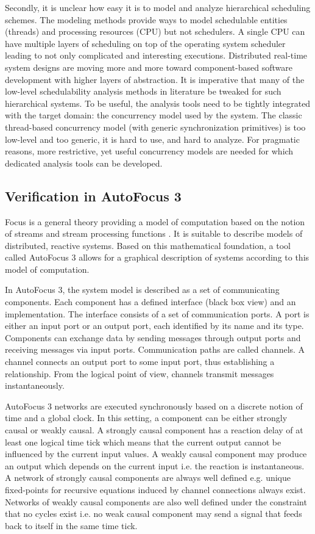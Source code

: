 Secondly, it is unclear how easy it is to model and analyze hierarchical scheduling schemes. The modeling methods provide ways to model schedulable entities (threads) and processing resources (CPU) but not schedulers. A single CPU can have multiple layers of scheduling on top of the operating system scheduler leading to not only complicated and interesting executions. Distributed real-time system designs are moving more and more toward component-based software development with higher layers of abstraction. It is imperative that many of the low-level schedulability analysis methods in literature be tweaked for such hierarchical systems. To be useful, the analysis tools need to be tightly integrated with the target domain: the concurrency model used by the system. The classic thread-based concurrency model (with generic synchronization primitives) is too low-level and too generic, it is hard to use, and hard to analyze. For pragmatic reasons, more restrictive, yet useful concurrency models are needed for which dedicated analysis tools can be developed. 

\subsection{Verification in AutoFocus 3}

Focus is a general theory providing a model of computation based on the notion of streams and stream processing functions \cite{broy2012specification}. It is suitable to describe models of distributed, reactive systems. Based on this mathematical foundation, a tool called AutoFocus 3 allows for a graphical description of systems according to this model of computation. 

In AutoFocus 3, the system model is described as a set of communicating components. Each component has a defined interface (black box view) and an implementation. The interface consists of a set of communication ports. A port is either an input port or an output port, each identified by its name and its type. Components can exchange data by sending messages through output ports and receiving messages via input ports. Communication paths are called channels. A channel connects an output port to some input port, thus establishing a relationship. From the logical point of view, channels transmit messages instantaneously.

AutoFocus 3 networks are executed synchronously based on a discrete notion of time and a global clock. In this setting, a component can be either strongly causal or weakly causal. A strongly causal component has a reaction delay of at least one logical time tick which means that the current output cannot be influenced by the current input values. A weakly causal component may produce an output which depends on the current input i.e. the reaction is instantaneous. A network of strongly causal components are always well defined e.g. unique fixed-points for recursive equations induced by channel connections always exist. Networks of weakly causal components are also well defined under the constraint that no cycles exist i.e. no weak causal component may send a signal that feeds back to itself in the same time tick. 

